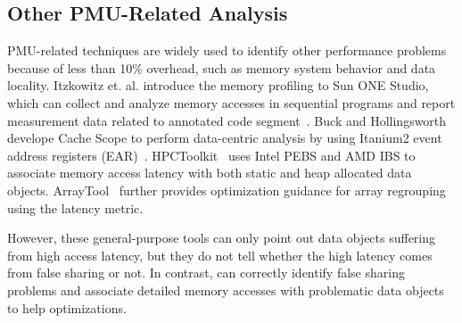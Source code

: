 
\subsection{Other PMU-Related Analysis}

PMU-related techniques are widely used to identify other performance problems because of less than 10\% overhead, such as memory system behavior and data locality. Itzkowitz et. al. introduce the memory profiling to Sun ONE Studio, which can collect and analyze memory accesses in sequential programs and report measurement data related to annotated code segment~\cite{DBLP:conf/sc/ItzkowitzWAK03}. Buck and Hollingsworth develope Cache Scope to perform data-centric analysis by using Itanium2 event address registers (EAR)~\cite{DBLP:conf/sc/BuckH04}. HPCToolkit~\cite{ibs-sc} uses Intel PEBS and AMD IBS to associate memory access latency with both static and heap allocated data objects. ArrayTool~\cite{ibs-pact} further provides optimization guidance for array regrouping using the latency metric. 

However, these general-purpose tools can only point out data objects suffering from high access latency, but they do not tell whether the high latency comes from false sharing or not. In contrast, \cheetah{} can correctly identify false sharing problems and associate detailed memory accesses with problematic data objects to help optimizations.





